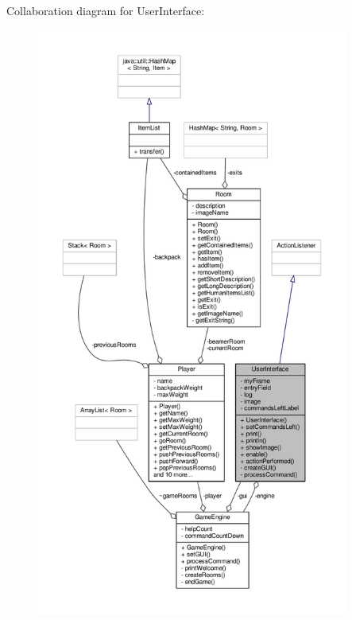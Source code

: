 Collaboration diagram for User\-Interface\-:
\nopagebreak
\begin{figure}[H]
\begin{center}
\leavevmode
\includegraphics[height=550pt]{classUserInterface__coll__graph}
\end{center}
\end{figure}
